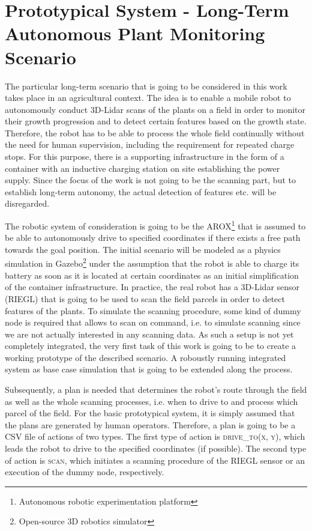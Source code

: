 \documentclass[german, master, expose, latin1]{base/thesis_KBS}
\begin{document}
\section{Prototypical System - Long-Term Autonomous Plant Monitoring Scenario}

The particular long-term scenario that is going to be considered in this work takes place in an agricultural context.
The idea is to enable a mobile robot to autonomously conduct 3D-Lidar scans of the plants on a field in order to monitor their growth progression and 
to detect certain features based on the growth state. Therefore, the robot has to be able to process the whole field continually without the need for human supervision,
including the requirement for repeated charge stops. For this purpose, there is a supporting infrastructure in the form of a container with an inductive charging station on site
establishing the power supply. Since the focus of the work is not going to be the scanning part, but to establish long-term autonomy, 
the actual detection of features etc. will be disregarded.\newline

The robotic system of consideration is going to be the AROX\footnote{Autonomous robotic experimentation platform} that is assumed to be able to autonomously drive to specified
coordinates if there exists a free path towards the goal position. The initial scenario will be modeled as a physics simulation in Gazebo\footnote{Open-source 3D robotics simulator} 
under the assumption that the robot is able to charge its battery as soon as it is located at certain coordinates as an initial simplification of the container infrastructure.
In practice, the real robot has a 3D-Lidar sensor (RIEGL) that is going to be used to scan the field parcels in order to detect features of the plants.
To simulate the scanning procedure, some kind of dummy node is required that allows to scan on command, i.e. to simulate scanning since we are not actually
interested in any scanning data. As such a setup is not yet completely integrated, the very first task of this work is going to be to create a working prototype of
the described scenario. A roboustly running integrated system as base case simulation that is going to be extended along the process.\newline

Subsequently, a plan is needed that determines the robot's route through the field as well as the whole scanning processes, i.e. when to drive to and process which parcel of the field.
For the basic prototypical system, it is simply assumed that the plans are generated by human operators. Therefore, a plan is going to be a CSV file of actions of two types.
The first type of action is \textsc{drive\_to(x, y)}, which leads the robot to drive to the specified coordinates (if possible). The second type of action is \textsc{scan},
which initiates a scanning procedure of the RIEGL sensor or an execution of the dummy node, respectively.\newline
\end{document}
